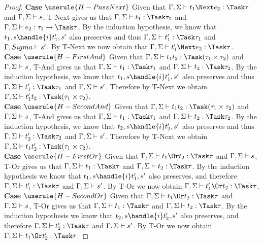 \begin{proof}
  \noindent\textbf{Case} $\userule{H-PassNext}$ Given that $\Gamma,\Sigma\infers t_1\Next e_2:\Task\tau$ and $\Gamma,\Sigma\vdash s$, T-Next gives us that $\Gamma,\Sigma\infers t_1:\Task\tau_1$ and $\Gamma,\Sigma\infers e_2:\tau_1\to\Task\tau$. By the induction hypothesis, we know that $t_1,s\handle{i}t_1',s'$ also preserves and thus $\Gamma,\Sigma\infers t_1':\Task\tau_1$ and $\Gamma,Sigma\vdash s'$. By T-Next we now obtain that $\Gamma,\Sigma\infers t_1'\Next e_2:\Task\tau$. \\

  \noindent\textbf{Case} $\userule{H-FirstAnd}$ Given that $\Gamma,\Sigma\infers t_1\And t_2:\Task(\tau_1\times\tau_2)$ and $\Gamma,\Sigma\vdash s$, T-And gives us that $\Gamma,\Sigma\infers t_1:\Task\tau_1$ and $\Gamma,\Sigma\infers t_2:\Task\tau_2$. By the induction hypothesis, we know that $t_1,s\handle{i}t_1',s'$ also preserves and thus $\Gamma,\Sigma\infers t_1':\Task\tau_1$ and $\Gamma,\Sigma\vdash s'$. Therefore by T-Next we obtain $\Gamma,\Sigma\infers t_1'\And t_2:\Task(\tau_1\times\tau_2)$.\\

  \noindent\textbf{Case} $\userule{H-SecondAnd}$ Given that $\Gamma,\Sigma\infers t_1\And t_2:\Task(\tau_1\times\tau_2)$ and $\Gamma,\Sigma\vdash s$, T-And gives us that $\Gamma,\Sigma\infers t_1:\Task\tau_1$ and $\Gamma,\Sigma\infers t_2:\Task\tau_2$. By the induction hypothesis, we know that $t_2,s\handle{i}t_2',s'$ also preserves and thus $\Gamma,\Sigma\infers t_2':\Task\tau_2$ and $\Gamma,\Sigma\vdash s'$. Therefore by T-Next we obtain $\Gamma,\Sigma\infers t_1\And t_2':\Task(\tau_1\times\tau_2)$.\\

  \noindent\textbf{Case} $\userule{H-FirstOr}$ Given that $\Gamma,\Sigma\infers t_1\Or t_2:\Task\tau$ and $\Gamma,\Sigma\vdash s$, T-Or gives us that $\Gamma,\Sigma\infers t_1:\Task\tau$ and $\Gamma,\Sigma\infers t_2:\Task\tau$. By the induction hypothesis we know that $t_1,s\handle{i}t_1',s'$ also preserves, and therefore $\Gamma,\Sigma\infers t_1':\Task\tau$ and $\Gamma,\Sigma\vdash s'$. By T-Or we now obtain $\Gamma,\Sigma\infers t_1'\Or t_2:\Task\tau$.\\

  \noindent\textbf{Case} $\userule{H-SecondOr}$ Given that $\Gamma,\Sigma\infers t_1\Or t_2:\Task\tau$ and $\Gamma,\Sigma\vdash s$, T-Or gives us that $\Gamma,\Sigma\infers t_1:\Task\tau$ and $\Gamma,\Sigma\infers t_2:\Task\tau$. By the induction hypothesis we know that $t_2,s\handle{i}t_2',s'$ also preserves, and therefore $\Gamma,\Sigma\infers t_2':\Task\tau$ and $\Gamma,\Sigma\vdash s'$. By T-Or we now obtain $\Gamma,\Sigma\infers t_1\Or t_2':\Task\tau$.
\end{proof}

